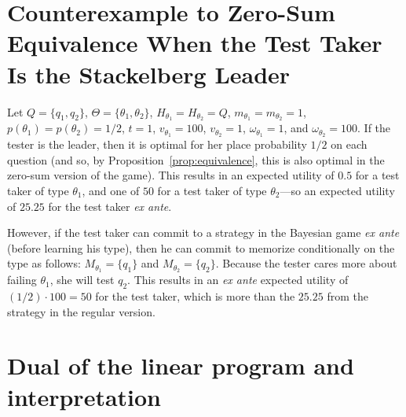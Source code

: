\documentclass{article}
\begin{document}
\appendix

\section{Counterexample to Zero-Sum Equivalence When the Test Taker Is the
  Stackelberg Leader}
\label{se:counterexample}

Let $Q=\{q_1,q_2\}$, $\Theta=\{\theta_1,\theta_2\}$,
$H_{\theta_1}=H_{\theta_2}=Q$, $m_{\theta_1}=m_{\theta_2}=1$,
$p(\theta_1)=p(\theta_2)=1/2$, $t=1$, $v_{\theta_1} = 100$, $v_{\theta_2} =
1$, $\omega_{\theta_1} = 1$, and $\omega_{\theta_2} = 100$.  If the tester
is the leader, then it is optimal for her place probability $1/2$ on each
question (and so, by Proposition~\ref{prop:equivalence}, this is also
optimal in the zero-sum version of the game).  This results in an expected
utility of $0.5$ for a test taker of type $\theta_1$, and one of $50$ for a
test taker of type $\theta_2$---so an expected utility of $25.25$ for the
test taker {\em ex ante}.

However, if the test taker can commit to a strategy in the Bayesian game
{\em ex ante} (before learning his type), then he can commit to
memorize conditionally on the type as follows: $M_{\theta_1} =\{q_1\}$ and 
$M_{\theta_2} =\{q_2\}$.  Because the tester cares more about failing
$\theta_1$, she will test $q_2$.  This results in an {\em ex ante} expected
utility of $(1/2) \cdot 100 = 50$ for the test taker, which is more than
the $25.25$ from the strategy in the regular version.













\section{Dual of the linear program and interpretation}




\end{document}
